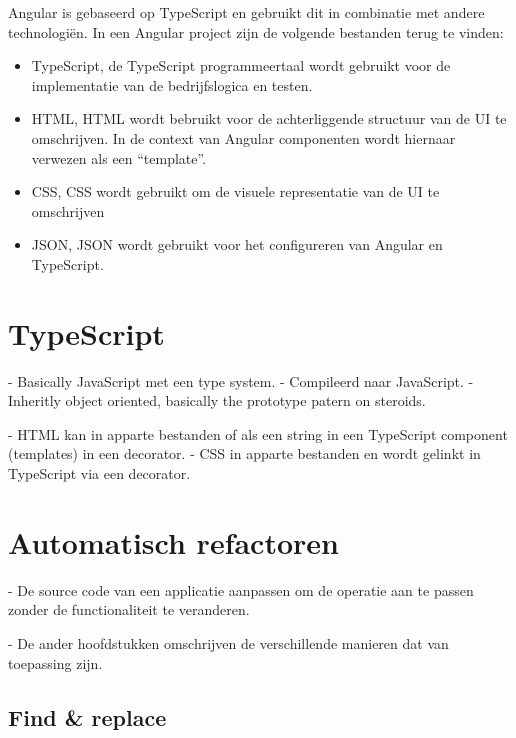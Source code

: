 Angular is gebaseerd op TypeScript en gebruikt dit in combinatie met andere technologiën.
In een Angular project zijn de volgende bestanden terug te vinden:
\begin{itemize}
  \item TypeScript, de TypeScript programmeertaal wordt gebruikt voor de implementatie van de bedrijfslogica en testen.
  \item HTML, HTML wordt bebruikt voor de achterliggende structuur van de UI te omschrijven. 
    In de context van Angular componenten wordt hiernaar verwezen als een ``template''.
  \item CSS, CSS wordt gebruikt om de visuele representatie van de UI te omschrijven
  \item JSON, JSON wordt gebruikt voor het configureren van Angular en TypeScript.
\end{itemize}

\section{TypeScript}
\label{ch:stand-van-zaken:typescript}


- Basically JavaScript met een type system.
- Compileerd naar JavaScript.
- Inheritly object oriented, basically the prototype patern on steroids.


- HTML kan in apparte bestanden of als een string in een TypeScript component (templates) in een decorator.
- CSS in apparte bestanden en wordt gelinkt in TypeScript via een decorator.

\section{Automatisch refactoren}
\label{ch:stand-van-zaken:refactoring}


- De source code van een applicatie aanpassen om de operatie aan te passen zonder de functionaliteit te veranderen.


- De ander hoofdstukken omschrijven de verschillende manieren dat van toepassing zijn.

\subsection{Find \& replace}
\label{ch:stand-van-zaken:refactoring:find-and-replace}

